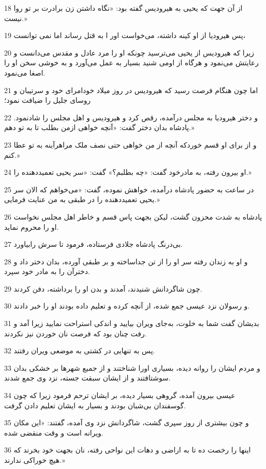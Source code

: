 \par 18 از آن جهت که یحیی به هیرودیس گفته بود: «نگاه داشتن زن برادرت بر تو روا نیست.»
\par 19 پس هیرودیا از او کینه داشته، می‌خواست اور ا به قتل رساند اما نمی توانست،
\par 20 زیرا که هیرودیس از یحیی می‌ترسید چونکه او را مرد عادل و مقدس می‌دانست و رعایتش می‌نمود و هرگاه از اومی شنید بسیار به عمل می‌آورد و به خوشی سخن او را اصغا می‌نمود.
\par 21 اما چون هنگام فرصت رسید که هیرودیس در روز میلاد خودامرای خود و سرتیبان و روسای جلیل را ضیافت نمود؛
\par 22 و دختر هیرودیا به مجلس درآمده، رقص کرد و هیرودیس و اهل مجلس را شادنمود. پادشاه بدان دختر گفت: «آنچه خواهی ازمن بطلب تا به تو دهم.»
\par 23 و از برای او قسم خوردکه آنچه از من خواهی حتی نصف ملک مراهرآینه به تو عطا کنم.»
\par 24 او بیرون رفته، به مادرخود گفت: «چه بطلبم؟» گفت: «سر یحیی تعمیددهنده را.»
\par 25 در ساعت به حضور پادشاه درآمده، خواهش نموده، گفت: «می‌خواهم که الان سر یحیی تعمید‌دهنده را در طبقی به من عنایت فرمایی.»
\par 26 پادشاه به شدت محزون گشت، لیکن بجهت پاس قسم و خاطر اهل مجلس نخواست او را محروم نماید.
\par 27 بی‌درنگ پادشاه جلادی فرستاده، فرمود تا سرش رابیاورد.
\par 28 و او به زندان رفته سر او را از تن جداساخته و بر طبقی آورده، بدان دختر داد و دخترآن را به مادر خود سپرد.
\par 29 چون شاگردانش شنیدند، آمدند و بدن او را برداشته، دفن کردند.
\par 30 و رسولان نزد عیسی جمع شده، از آنچه کرده و تعلیم داده بودند او را خبر دادند.
\par 31 بدیشان گفت شما به خلوت، به‌جای ویران بیایید و اندکی استراحت نمایید زیرا آمد و رفت چنان بود که فرصت نان خوردن نیز نکردند.
\par 32 پس به تنهایی در کشتی به موضعی ویران رفتند.
\par 33 و مردم ایشان را روانه دیده، بسیاری اورا شناختند و از جمیع شهرها بر خشکی بدان سوشتافتند و از ایشان سبقت جسته، نزد وی جمع شدند.
\par 34 عیسی بیرون آمده، گروهی بسیار دیده، بر ایشان ترحم فرمود زیرا که چون گوسفندان بی‌شبان بودند و بسیار به ایشان تعلیم دادن گرفت.
\par 35 و چون بیشتری از روز سپری گشت، شاگردانش نزد وی آمده، گفتند: «این مکان ویرانه است و وقت منقضی شده.
\par 36 اینها را رخصت ده تا به اراضی و دهات این نواحی رفته، نان بجهت خود بخرند که هیچ خوراکی ندارند.»
